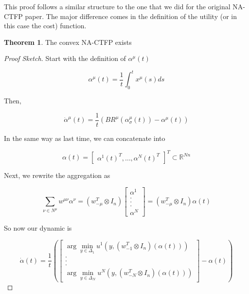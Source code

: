 \documentclass[preprint,12pt]{article}
\theoremstyle{definition}
\theoremstyle{theorem}
\newtheorem{theorem}{Theorem}
\theoremstyle{remark}
\theoremstyle{example}
\begin{document}
	This proof follows a similar structure to the one that we did for the original NA-CTFP paper. The major difference comes in the definition of the utility (or in this case the cost) function.
	
	\begin{theorem}
		The convex NA-CTFP exists
	\end{theorem}

	\begin{proof}[Proof Sketch]
		Start with the definition of $\alpha^\mu(t)$
		
		\begin{equation}
			\alpha^\mu(t) = \frac{1}{t} \int_0^t x^\mu(s) ds 
		\end{equation}
	
		Then,
		
		\begin{equation}
			\dot{\alpha}^\mu(t) = \frac{1}{t} \left( BR^\mu(\alpha_\sigma^\mu(t) ) - \alpha^\mu(t)  \right)
		\end{equation}
	
		In the same way as last time, we can concatenate into 
	
		\begin{equation}
			\alpha(t) = \begin{bmatrix}
				\alpha^1(t)^T, \ldots, \alpha^N(t)^T
			\end{bmatrix}^T \subset \mathbb{R}^{Nn}
		\end{equation}
	
	Next, we rewrite the aggregation as 
	
 	\begin{equation}
		\sum_{\nu \in N^\mu} w^{\mu \nu} \alpha^\nu = (w_{-\mu}^T \otimes I_n) \begin{bmatrix}
			\alpha^1 \\ . \\ . \\ . \\ \alpha^N
		\end{bmatrix} = (w_{-\mu}^T \otimes I_n) \alpha(t)
	\end{equation}
	
	So now our dynamic is
	
	\begin{equation}
		\dot{\alpha}(t) = \frac{1}{t} \left( \begin{bmatrix}
			\arg\min_{y \in \Delta_1} u^1(y, (w_{-1}^T \otimes I_n) ( \alpha (t) ) ) \\ . \\ . \\ . \\ \arg\min_{y \in \Delta_N} u^N(y, (w_{-N}^T \otimes I_n)( \alpha (t) ))
		\end{bmatrix}  - \alpha(t)  \right)
	\end{equation}
	

\end{proof}
\end{document}
